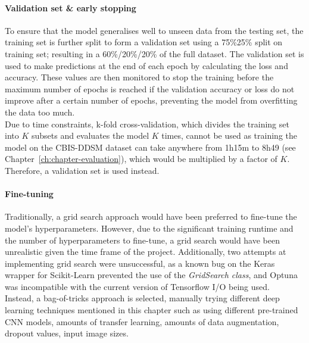 \paragraph{Validation set \& early stopping}
\label{sec:design-validation-early-stopping}

To ensure that the model generalises well to unseen  data from the testing set, the training set is further split to form a validation set using a 75\%25\% split on training set; resulting in a 60\%/20\%/20\% of the full dataset. The validation set is used to make predictions at the end of each epoch by calculating the loss and accuracy. These values are then monitored to stop the training before the maximum number of epochs is reached if the validation accuracy or loss do not improve after a certain number of epochs, preventing the model from overfitting the data too much.\\

Due to time constraints, k-fold cross-validation, which divides the training set into $K$ subsets and evaluates the model $K$ times, cannot be used as training the model on the CBIS-DDSM dataset can take anywhere from 1h15m to 8h49 (see Chapter~\ref{ch:chapter-evaluation}), which would be multiplied by a factor of $K$. Therefore, a validation set is used instead.

\paragraph{Fine-tuning}
\label{sec:design-fine-tuning-bagoftricks}

Traditionally, a grid search approach would have been preferred to fine-tune the model's hyperparameters. However, due to the significant training runtime and the number of hyperparameters to fine-tune, a grid search would have been unrealistic given the time frame of the project. Additionally, two attempts at implementing grid search were unsuccessful, as a known bug on the Keras wrapper for Scikit-Learn prevented the use of the \textit{GridSearch class}, and Optuna was incompatible with the current version of Tensorflow I/O being used.\\

Instead, a bag-of-tricks approach is selected, manually trying different deep learning techniques mentioned in this chapter such as using different pre-trained CNN models, amounts of transfer learning, amounts of data augmentation, dropout values, input image sizes.

